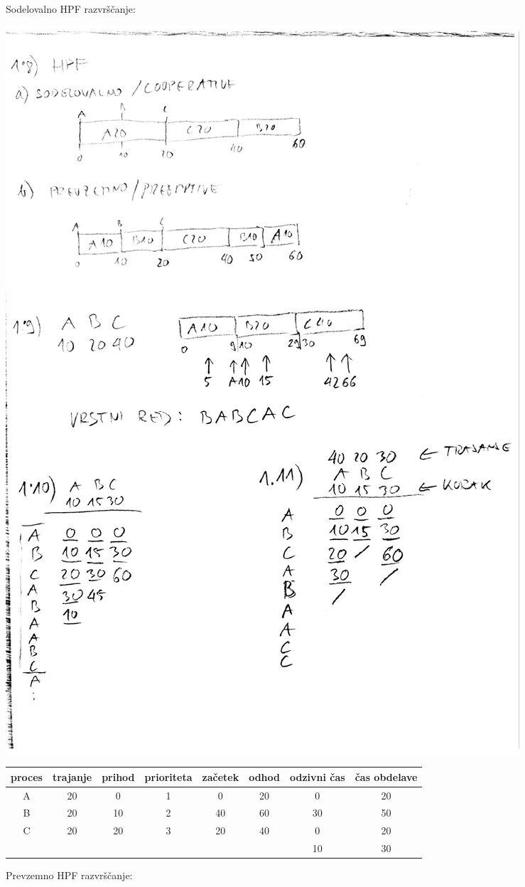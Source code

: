 \begin{Answer}
Sodelovalno HPF razvrščanje:
\begin{center}
\includegraphics[width=.9\textwidth]{razvrscanje/1.8-HPF-cooperative.pdf}\\
\begin{tabular}{c|ccc|cc|cc}
proces & trajanje & prihod & prioriteta & začetek & odhod & odzivni čas & čas obdelave \\
\hline
A & 20 &  0 &  1 &   0 & 20 & 0 & 20 \\
B & 20 & 10 & 2 & 40 & 60 & 30 & 50 \\
C & 20 & 20 & 3 & 20 & 40 & 0 & 20 \\
\hline
& & & & & & 10 & 30
\end{tabular}
\end{center}
Prevzemno HPF razvrščanje:
\begin{center}

\end{center}
\end{Answer}
